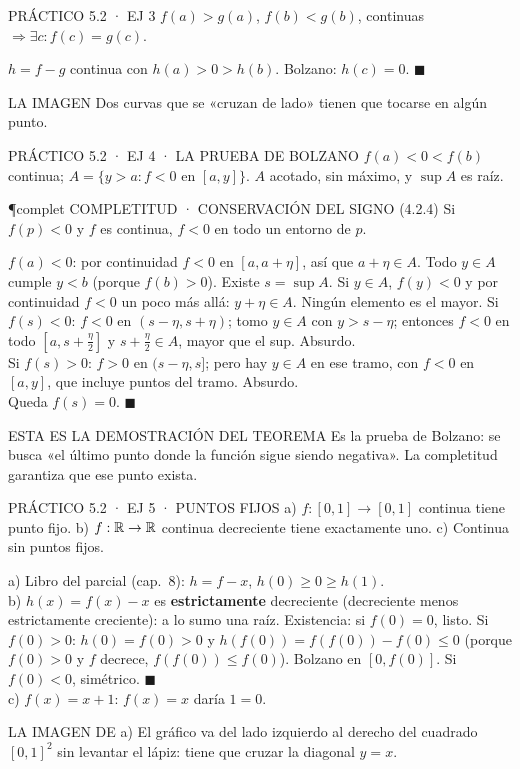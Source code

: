 \begin{enunciado}{PRÁCTICO 5.2 · EJ 3}
$f(a)>g(a)$, $f(b)<g(b)$, continuas $\Rightarrow\exists c:f(c)=g(c)$.
\end{enunciado}
$h=f-g$ continua con $h(a)>0>h(b)$. Bolzano: $h(c)=0$. $\blacksquare$
\begin{tip}{LA IMAGEN}
Dos curvas que se «cruzan de lado» tienen que tocarse en algún punto.
\end{tip}

\begin{enunciado}{PRÁCTICO 5.2 · EJ 4 · LA PRUEBA DE BOLZANO}
$f(a)<0<f(b)$ continua; $A=\{y>a:f<0\text{ en }[a,y]\}$. $A$ acotado, sin máximo, y $\sup A$ es raíz.
\end{enunciado}
\begin{uso}{\P{complet} COMPLETITUD · CONSERVACIÓN DEL SIGNO (4.2.4)}
Si $f(p)<0$ y $f$ es continua, $f<0$ en todo un entorno de $p$.
\end{uso}
$f(a)<0$: por continuidad $f<0$ en $[a,a+\eta]$, así que $a+\eta\in A$. Todo $y\in A$ cumple $y<b$ (porque $f(b)>0$). Existe $s=\sup A$.
Si $y\in A$, $f(y)<0$ y por continuidad $f<0$ un poco más allá: $y+\eta\in A$. Ningún elemento es el mayor.
Si $f(s)<0$: $f<0$ en $(s-\eta,s+\eta)$; tomo $y\in A$ con $y>s-\eta$; entonces $f<0$ en todo $[a,s+\frac\eta2]$ y $s+\frac\eta2\in A$, mayor que el sup. Absurdo.\\
Si $f(s)>0$: $f>0$ en $(s-\eta,s]$; pero hay $y\in A$ en ese tramo, con $f<0$ en $[a,y]$, que incluye puntos del tramo. Absurdo.\\
Queda $f(s)=0$. $\blacksquare$
\begin{tip}{ESTA ES LA DEMOSTRACIÓN DEL TEOREMA}
Es la prueba de Bolzano: se busca «el último punto donde la función sigue siendo negativa». La completitud garantiza que ese punto exista.
\end{tip}

\begin{enunciado}{PRÁCTICO 5.2 · EJ 5 · PUNTOS FIJOS}
a) $f:[0,1]\to[0,1]$ continua tiene punto fijo. b) $f:\mathbb{R}\to\mathbb{R}$ continua decreciente tiene exactamente uno. c) Continua sin puntos fijos.
\end{enunciado}
a) Libro del parcial (cap.\ 8): $h=f-x$, $h(0)\ge0\ge h(1)$.\\[2pt]
b) $h(x)=f(x)-x$ es \textbf{estrictamente} decreciente (decreciente menos estrictamente creciente): a lo sumo una raíz. Existencia: si $f(0)=0$, listo. Si $f(0)>0$: $h(0)=f(0)>0$ y $h(f(0))=f(f(0))-f(0)\le0$ (porque $f(0)>0$ y $f$ decrece, $f(f(0))\le f(0)$). Bolzano en $[0,f(0)]$. Si $f(0)<0$, simétrico. $\blacksquare$\\[2pt]
c) $f(x)=x+1$: $f(x)=x$ daría $1=0$.
\begin{tip}{LA IMAGEN DE a)}
El gráfico va del lado izquierdo al derecho del cuadrado $[0,1]^2$ sin levantar el lápiz: tiene que cruzar la diagonal $y=x$.
\end{tip}

